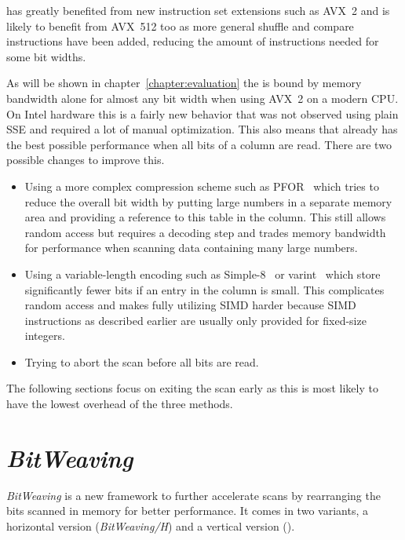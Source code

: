 \simdscan{} has greatly benefited from new instruction set extensions such as
AVX~2 \cite{AVX2-Scan} and is likely to benefit from AVX~512 too as more general
shuffle and compare instructions have been added, reducing the amount of
instructions needed for some bit widths.


As will be shown in chapter~\ref{chapter:evaluation} the \simdscan{} is bound by
memory bandwidth alone for almost any bit width when using AVX~2 on a modern
CPU. On Intel hardware this is a fairly new behavior that was not observed using
plain SSE \cite{AVX2-Scan} and required a lot of manual optimization. This also
means that \simdscan{} already has the best possible performance when all bits
of a column are read. There are two possible changes to improve this.

\begin{itemize}
  \item Using a more complex compression scheme such as PFOR~\cite{PFOR} which
    tries to reduce the overall bit width by putting large numbers in a separate
    memory area and providing a reference to this table in the column. This
    still allows random access but requires a decoding step and trades
    memory bandwidth for performance when scanning data containing many large
    numbers.
  \item Using a variable-length encoding such as Simple-8~\cite{Simple8} or
    varint~\cite{varint} which store significantly fewer bits if an entry in the
    column is small. This complicates random access and makes fully utilizing
    SIMD harder because SIMD instructions as described earlier are usually only
    provided for fixed-size integers.
  \item Trying to abort the scan before all bits are read.
\end{itemize}

The following sections focus on exiting the scan early as this is most likely to
have the lowest overhead of the three methods.

\section{\emph{BitWeaving}}

\emph{BitWeaving} \cite{BitWeaving} is a new framework to further accelerate
scans by rearranging the bits scanned in memory for better performance. It comes
in two variants, a horizontal version (\emph{BitWeaving/H}) and a vertical
version (\bwv{}).

